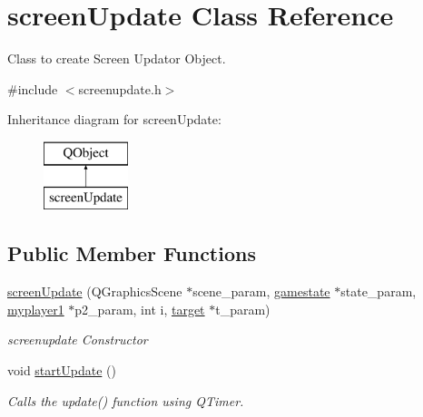 \hypertarget{classscreen_update}{}\section{screen\+Update Class Reference}
\label{classscreen_update}


Class to create Screen Updator Object.  




{\ttfamily \#include $<$screenupdate.\+h$>$}

Inheritance diagram for screen\+Update\+:\begin{figure}[H]
\begin{center}
\leavevmode
\includegraphics[height=2.000000cm]{classscreen_update}
\end{center}
\end{figure}
\subsection*{Public Member Functions}
\begin{DoxyCompactItemize}
\item 
\hyperlink{classscreen_update_ad92b56fb1e5fde3508070357acb89dfd}{screen\+Update} (Q\+Graphics\+Scene $\ast$scene\+\_\+param, \hyperlink{classgamestate}{gamestate} $\ast$state\+\_\+param, \hyperlink{classmyplayer1}{myplayer1} $\ast$p2\+\_\+param, int i, \hyperlink{classtarget}{target} $\ast$t\+\_\+param)
\begin{DoxyCompactList}\small\item\em screenupdate Constructor \end{DoxyCompactList}\item 
\mbox{\label{classscreen_update_a23e41b958b924804dbe4986619c091d0}} 
void \hyperlink{classscreen_update_a23e41b958b924804dbe4986619c091d0}{start\+Update} ()
\begin{DoxyCompactList}\small\item\em Calls the update() function using Q\+Timer. \end{DoxyCompactList}\end{DoxyCompactItemize}
